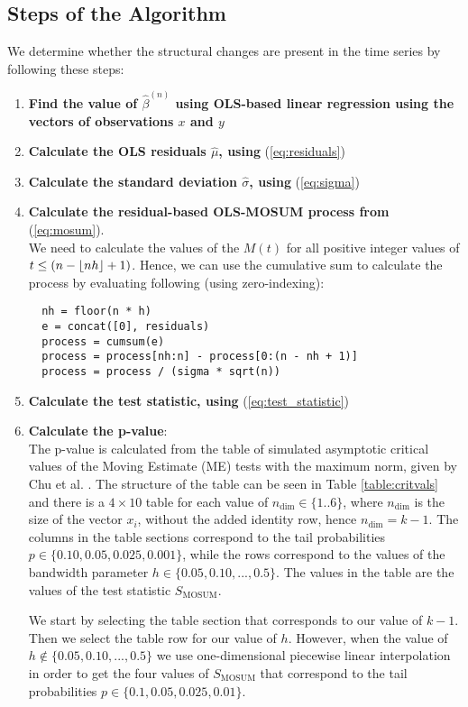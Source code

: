 \documentclass[main.tex]{subfiles}
\begin{document}
\subsection{Steps of the Algorithm}
We determine whether the structural changes are present in the time series by following these steps:
\label{subsec:the_algorithm_steps}
\begin{enumerate}
\item \textbf{Find the value of $\hat{\beta}^{(n)}$ using OLS-based linear
  regression using the vectors of observations $x$ and $y$}
\item \textbf{Calculate the OLS residuals $\hat{\mu}$, using} (\ref{eq:residuals})
\item \textbf{Calculate the standard deviation $\hat{\sigma}$, using} (\ref{eq:sigma})
\item \textbf{Calculate the residual-based OLS-MOSUM process from} (\ref{eq:mosum}). \\
  We need to calculate the values of the $M(t)$ for all positive integer values of
  $t \leq (n - \lfloor nh\rfloor + 1)$. Hence, we can use the cumulative sum to
  calculate the process by evaluating following
  (using zero-indexing):
  \begin{verbatim}
  nh = floor(n * h)
  e = concat([0], residuals)
  process = cumsum(e)
  process = process[nh:n] - process[0:(n - nh + 1)]
  process = process / (sigma * sqrt(n))
  \end{verbatim}
\item \textbf{Calculate the test statistic, using} (\ref{eq:test_statistic})
\item \textbf{Calculate the p-value}:\\
  The p-value is calculated from the table of
  simulated asymptotic critical values of the Moving Estimate (ME) tests with
  the maximum norm, given by Chu et al. \cite{moving_estimate_test}. The structure of the table can
  be seen in Table \ref{table:critvals} and there is a $4 \times 10$ table for
  each value of $n_{\text{dim}} \in \{1..6\}$, where $n_{\text{dim}}$ is the
  size of the vector $x_i$, without the added identity row, hence
  $n_{\text{dim}} = k - 1$. The columns in the table sections correspond to the
  tail probabilities $p \in \{0.10, 0.05, 0.025, 0.001\}$, while the rows
  correspond to the values of the bandwidth parameter
  $h \in \{0.05, 0.10, ..., 0.5\}$. The values in the table are the values of
  the test statistic $S_{\text{MOSUM}}$.

  We start by selecting the table section that corresponds to our value of
  $k-1$. Then we select the table row for our value of $h$.
  However, when the value of $h \notin \{0.05, 0.10, ..., 0.5\}$
  we use one-dimensional piecewise linear interpolation in order to get the four
  values of $S_{\text{MOSUM}}$ that correspond to the tail probabilities 
  $p \in \{0.1, 0.05, 0.025, 0.01\}$. 


\end{enumerate}
\end{document}

